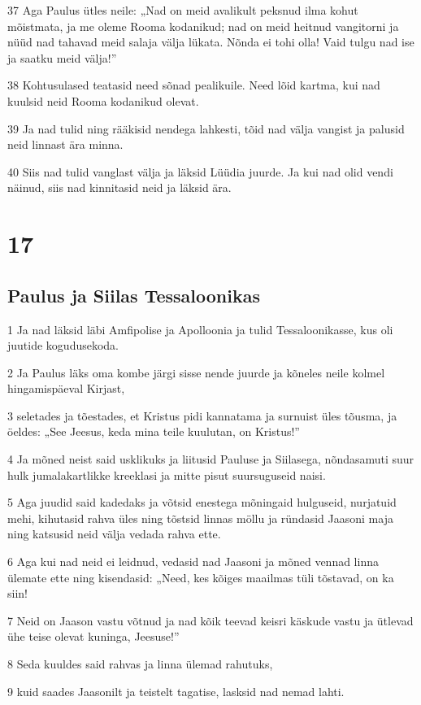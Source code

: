 \par 37 Aga Paulus ütles neile: „Nad on meid avalikult peksnud ilma kohut mõistmata, ja me oleme Rooma kodanikud; nad on meid heitnud vangitorni ja nüüd nad tahavad meid salaja välja lükata. Nõnda ei tohi olla! Vaid tulgu nad ise ja saatku meid välja!”
\par 38 Kohtusulased teatasid need sõnad pealikuile. Need lõid kartma, kui nad kuulsid neid Rooma kodanikud olevat.
\par 39 Ja nad tulid ning rääkisid nendega lahkesti, tõid nad välja vangist ja palusid neid linnast ära minna.
\par 40 Siis nad tulid vanglast välja ja läksid Lüüdia juurde. Ja kui nad olid vendi näinud, siis nad kinnitasid neid ja läksid ära.


\chapter{17}

\section*{Paulus ja Siilas Tessaloonikas}

\par 1 Ja nad läksid läbi Amfipolise ja Apolloonia ja tulid Tessaloonikasse, kus oli juutide kogudusekoda.
\par 2 Ja Paulus läks oma kombe järgi sisse nende juurde ja kõneles neile kolmel hingamispäeval Kirjast,
\par 3 seletades ja tõestades, et Kristus pidi kannatama ja surnuist üles tõusma, ja öeldes: „See Jeesus, keda mina teile kuulutan, on Kristus!”
\par 4 Ja mõned neist said usklikuks ja liitusid Pauluse ja Siilasega, nõndasamuti suur hulk jumalakartlikke kreeklasi ja mitte pisut suursuguseid naisi.
\par 5 Aga juudid said kadedaks ja võtsid enestega mõningaid hulguseid, nurjatuid mehi, kihutasid rahva üles ning tõstsid linnas möllu ja ründasid Jaasoni maja ning katsusid neid välja vedada rahva ette.
\par 6 Aga kui nad neid ei leidnud, vedasid nad Jaasoni ja mõned vennad linna ülemate ette ning kisendasid: „Need, kes kõiges maailmas tüli tõstavad, on ka siin!
\par 7 Neid on Jaason vastu võtnud ja nad kõik teevad keisri käskude vastu ja ütlevad ühe teise olevat kuninga, Jeesuse!”
\par 8 Seda kuuldes said rahvas ja linna ülemad rahutuks,
\par 9 kuid saades Jaasonilt ja teistelt tagatise, lasksid nad nemad lahti.

